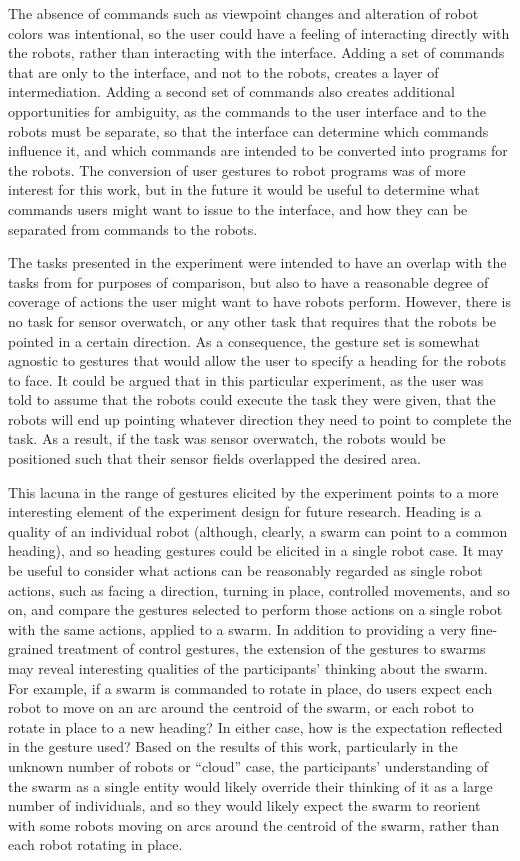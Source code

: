 The absence of commands such as viewpoint changes and alteration of robot colors was intentional, so the user could have a feeling of interacting directly with the robots, rather than interacting with the interface. 
Adding a set of commands that are only to the interface, and not to the robots, creates a layer of intermediation. 
Adding a second set of commands also creates additional opportunities for ambiguity, as the commands to the user interface and to the robots must be separate, so that the interface can determine which commands influence it, and which commands are intended to be converted into programs for the robots. 
The conversion of user gestures to robot programs was of more interest for this work, but in the future it would be useful to determine what commands users might want to issue to the interface, and how they can be separated from commands to the robots. 

The tasks presented in the experiment were intended to have an overlap with the tasks from \citep{micire2010multi} for purposes of comparison, but also to have a reasonable degree of coverage of actions the user might want to have robots perform. 
However, there is no task for sensor overwatch, or any other task that requires that the robots be pointed in a certain direction. 
As a consequence, the gesture set is somewhat agnostic to gestures that would allow the user to specify a heading for the robots to face. 
It could be argued that in this particular experiment, as the user was told to assume that the robots could execute the task they were given, that the robots will end up pointing whatever direction they need to point to complete the task. 
As a result, if the task was sensor overwatch, the robots would be positioned such that their sensor fields overlapped the desired area.

This lacuna in the range of gestures elicited by the experiment points to a more interesting element of the experiment design for future research. 
Heading is a quality of an individual robot (although, clearly, a swarm can point to a common heading), and so heading gestures could be elicited in a single robot case. 
It may be useful to consider what actions can be reasonably regarded as single robot actions, such as facing a direction, turning in place, controlled movements, and so on, and compare the gestures selected to perform those actions on a single robot with the same actions, applied to a swarm. 
In addition to providing a very fine-grained treatment of control gestures, the extension of the gestures to swarms may reveal interesting qualities of the participants' thinking about the swarm. 
For example, if a swarm is commanded to rotate in place, do users expect each robot to move on an arc around the centroid of the swarm, or each robot to rotate in place to a new heading?
In either case, how is the expectation reflected in the gesture used?
Based on the results of this work, particularly in the unknown number of robots or ``cloud'' case, the participants' understanding of the swarm as a single entity would likely override their thinking of it as a large number of individuals, and so they would likely expect the swarm to reorient with some robots moving on arcs around the centroid of the swarm, rather than each robot rotating in place. 

